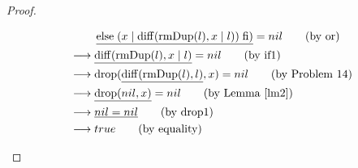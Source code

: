\documentclass[12pt, a4paper]{article}
\newcommand{\rel}[1]{\mathrel{#1}}
\newcommand{\rmx}[1]{\mathrm{#1}}
\newcommand{\larrow}{\longrightarrow}
\newcommand{\under}{\underline}
\begin{document}
\begin{proof}
\begin{description}
\begin{align*}
	&\quad \quad\ \under{\rel{\rmx{else}} (x \mid \rmx{diff}(\rmx{rmDup}(l), x \mid l)) \rel{\rmx{fi}})} = nil \tag{by or} \\
	&\larrow \under{\rmx{diff}(\rmx{rmDup}(l), x \mid l)} = nil \tag{by if1} \\
	&\larrow \rmx{drop}(\under{\rmx{diff}(\rmx{rmDup}(l), l)}, x) = nil \tag{by Problem 14} \\
	&\larrow \under{\rmx{drop}(nil, x)} = nil \tag{by Lemma~\ref{lm2}} \\
	&\larrow \under{nil = nil} \tag{by drop1} \\
	&\larrow true \tag{by equality}
\end{align*}
\end{description}
\end{proof}
\end{document}

